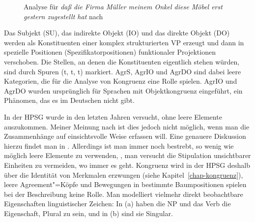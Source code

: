 \begin{figure}
\caption{\label{fig-konstituentenstellung-meinunger}Analyse für \emph{daß die Firma Müller meinem Onkel diese Möbel erst gestern zugestellt hat} 
nach }
\end{figure}
Das Subjekt (SU), das indirekte Objekt (IO) und das direkte Objekt (DO) werden als Konstituenten
einer komplex strukturierten VP erzeugt und dann in spezielle Positionen (Spezifikatorpositionen)
funktionaler Projektionen verschoben. Die Stellen, an denen die Konstituenten eigentlich stehen würden,
sind durch Spuren (t, t, t) markiert. AgrS, AgrIO und AgrDO sind dabei leere
Kategorien, die für die Analyse von Kongruenz eine Rolle spielen. AgrIO und
AgrDO wurden ursprünglich für Sprachen mit Objektkongruenz eingeführt, ein
Phänomen, das es im Deutschen nicht gibt.


In der HPSG wurde in den letzten Jahren versucht, ohne leere Elemente auszukommen. Meiner Meinung
nach ist dies jedoch nicht möglich, wenn man die Zusammenhänge auf einsichtsvolle Weise erfassen
will. Eine genauere Diskussion hierzu findet man in . Allerdings ist man immer
noch bestrebt, so wenig wie möglich leere Elemente zu verwenden, \dash, man versucht die Stipulation
unsichtbarer Einheiten zu vermeiden, wo immer es geht.
Kongruenz wird in der HPSG deshalb über die Identität von Merkmalen erzwungen (siehe
Kapitel~\ref{chap-kongruenz}), leere Agreement"=Köpfe und Bewegungen in bestimmte Baumpositionen
spielen bei der Beschreibung keine Rolle.  Man modelliert vielmehr direkt beobachtbare Eigenschaften
linguistischer Zeichen: In (a) haben die NP und das Verb die Eigenschaft, Plural zu sein, und
in (b) sind sie Singular.

